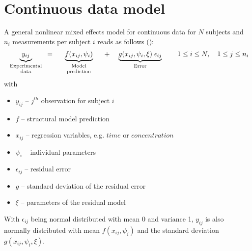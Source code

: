 \section{Continuous data model}
\label{sec:continuousDataModel}
A general nonlinear mixed effects model for continuous data for $N$ subjects and $n_i$ measurements per subject $i$ reads as follows (\cite{LavielleBook:2014}):
\begin{align}
 \underbrace{ y_{ij}}_{\text{\parbox{2cm}{\centering Experimental \\[-4pt]  data}}} =
 \underbrace{ f(x_{ij}, \psi_{i})}_{\text{\parbox{2.5cm}{\centering Model \\[-4pt]  prediction}}} + 
 \underbrace{ g(x_{ij}, \psi_{i}, \xi) \; \epsilon_{ij}}_{\text{\parbox{3cm}{\centering Error}}} 
\quad 1\le i \le N, \quad 1\le j \le n_i \label{eq:nlmeModel}
 \end{align}
with
\begin{itemize}
\item
$y_{ij}$ -- $j^{th}$ observation for subject $i$
\item
$f$ -- structural model prediction
\item
$x_{ij}$ -- regression variables, e.g. $time$ or $concentration$
\item
$\psi_{i}$ -- individual parameters
\item
$\epsilon_{ij}$ -- residual error
\item
$g$ -- standard deviation of the residual error
\item 
$\xi$ -- parameters of the residual model
\end{itemize}
With $\epsilon_{ij}$ being normal distributed with mean 0 and variance 1, $y_{ij}$ is also normally distributed with mean $ f(x_{ij}, \psi_{i})$ and the standard deviation $g(x_{ij}, \psi_{i}, \xi)$. 

